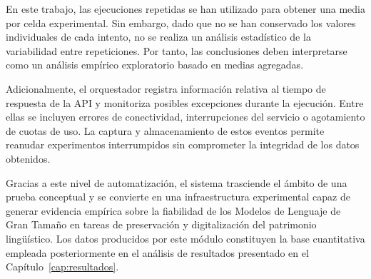 En este trabajo, las ejecuciones repetidas se han utilizado para obtener una media por celda experimental. Sin embargo, dado que no se han conservado los valores individuales de cada intento, no se realiza un análisis estadístico de la variabilidad entre repeticiones. Por tanto, las conclusiones deben interpretarse como un análisis empírico exploratorio basado en medias agregadas.

Adicionalmente, el orquestador registra información relativa al tiempo de respuesta de la API y monitoriza posibles excepciones durante la ejecución. Entre ellas se incluyen errores de conectividad, interrupciones del servicio o agotamiento de cuotas de uso. La captura y almacenamiento de estos eventos permite reanudar experimentos interrumpidos sin comprometer la integridad de los datos obtenidos.

Gracias a este nivel de automatización, el sistema trasciende el ámbito de una prueba conceptual y se convierte en una infraestructura experimental capaz de generar evidencia empírica sobre la fiabilidad de los Modelos de Lenguaje de Gran Tamaño en tareas de preservación y digitalización del patrimonio lingüístico. Los datos producidos por este módulo constituyen la base cuantitativa empleada posteriormente en el análisis de resultados presentado en el Capítulo~\ref{cap:resultados}.

















